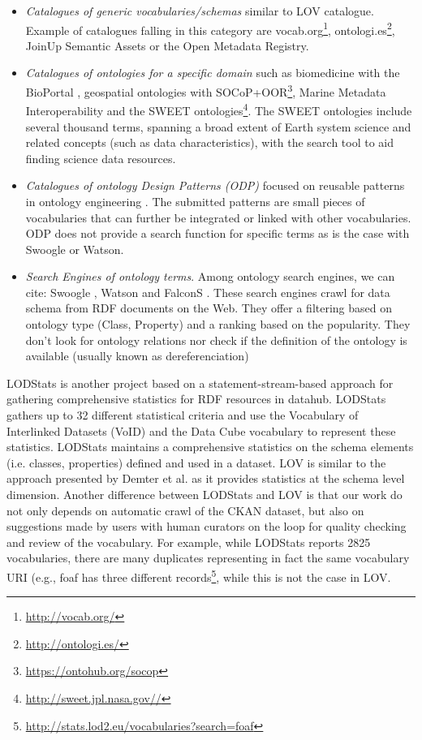 \documentclass{iosart2c}
\begin{document}
\begin{itemize}
 \item \textit{Catalogues of generic vocabularies/schemas} similar to LOV catalogue. Example of catalogues falling in this category are vocab.org\footnote{\url{http://vocab.org/}}, ontologi.es\footnote{\url{http://ontologi.es/}}, JoinUp Semantic Assets or the Open Metadata Registry.
 \item \textit{Catalogues of ontologies for a specific domain} such as biomedicine with the BioPortal \cite{bioportal11}, geospatial ontologies with SOCoP+OOR\footnote{\url{https://ontohub.org/socop}}, Marine Metadata Interoperability and the SWEET \cite{sweet05} ontologies\footnote{\url{http://sweet.jpl.nasa.gov//}}. The SWEET ontologies include several thousand terms, spanning a broad extent of Earth system science and related concepts (such as data characteristics), with the search tool to aid finding science data resources. 
 \item \textit{Catalogues of ontology Design Patterns (ODP)} focused on reusable patterns in ontology engineering \cite{presutti08}. The submitted patterns are small pieces of vocabularies that can further be integrated or linked with other vocabularies. ODP does not provide a search function for specific terms as is the case with Swoogle or Watson.
 \item \textit{Search Engines of ontology terms}. Among ontology search engines, we can cite: Swoogle \cite{finin2005swoogle}, Watson \cite{d2007watson,Sabou07} and FalconS \cite{cheng2008falcons}. These search engines crawl for data schema from RDF documents on the Web. They offer a filtering based on ontology type (Class, Property) and a ranking based on the popularity. They don't look for ontology relations nor check if the definition of the ontology is available (usually known as dereferenciation)
\end{itemize}

LODStats \cite{demter-2012-ekaw} is another project based on a statement-stream-based approach for gathering comprehensive statistics for RDF resources in datahub. LODStats gathers up to 32 different statistical criteria and use the Vocabulary of Interlinked Datasets (VoID)\cite{void2009} and the Data Cube vocabulary to represent these statistics. LODStats maintains a comprehensive statistics on the schema elements (i.e. classes, properties) defined and used in a dataset. LOV is similar to the approach presented by Demter et al. as it provides statistics at the schema level dimension. Another difference between LODStats and LOV is that our work do not only depends on automatic crawl of the CKAN dataset, but also on suggestions made by users with human curators on the loop for quality checking and review of the vocabulary. For example, while LODStats reports 2825 vocabularies, there are many duplicates representing in fact the same vocabulary URI (e.g., foaf has three different records\footnote{\url{http://stats.lod2.eu/vocabularies?search=foaf}}, while this is not the case in LOV. %
\end{document}
